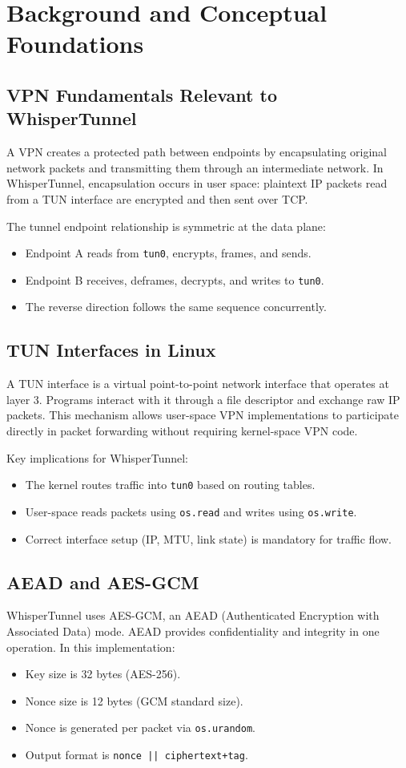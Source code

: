 \chapter{Background and Conceptual Foundations}

\section{VPN Fundamentals Relevant to WhisperTunnel}
A VPN creates a protected path between endpoints by encapsulating original network packets and transmitting them through an intermediate network. In WhisperTunnel, encapsulation occurs in user space: plaintext IP packets read from a TUN interface are encrypted and then sent over TCP.

The tunnel endpoint relationship is symmetric at the data plane:
\begin{itemize}[leftmargin=2em]
\item Endpoint A reads from \texttt{tun0}, encrypts, frames, and sends.
\item Endpoint B receives, deframes, decrypts, and writes to \texttt{tun0}.
\item The reverse direction follows the same sequence concurrently.
\end{itemize}

\section{TUN Interfaces in Linux}
A TUN interface is a virtual point-to-point network interface that operates at layer 3. Programs interact with it through a file descriptor and exchange raw IP packets. This mechanism allows user-space VPN implementations to participate directly in packet forwarding without requiring kernel-space VPN code.

Key implications for WhisperTunnel:
\begin{itemize}[leftmargin=2em]
\item The kernel routes traffic into \texttt{tun0} based on routing tables.
\item User-space reads packets using \texttt{os.read} and writes using \texttt{os.write}.
\item Correct interface setup (IP, MTU, link state) is mandatory for traffic flow.
\end{itemize}

\section{AEAD and AES-GCM}
WhisperTunnel uses AES-GCM, an AEAD (Authenticated Encryption with Associated Data) mode. AEAD provides confidentiality and integrity in one operation. In this implementation:
\begin{itemize}[leftmargin=2em]
\item Key size is 32 bytes (AES-256).
\item Nonce size is 12 bytes (GCM standard size).
\item Nonce is generated per packet via \texttt{os.urandom}.
\item Output format is \texttt{nonce || ciphertext+tag}.
\end{itemize}

